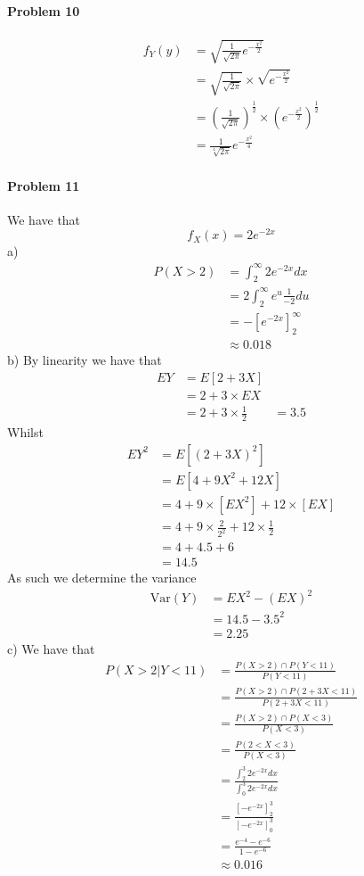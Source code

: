 \paragraph{Problem 10}
\begin{align*}
    f_{Y}(y)&=\sqrt{\frac{1}{\sqrt{2\pi}}e^{-\frac{x^{2}}{2}}} \\
            &=\sqrt{\frac{1}{\sqrt{2\pi}}}\times\sqrt{e^{-\frac{x^{2}}{2}}} \\
            &=\left(\frac{1}{\sqrt{2\pi}}\right)^{\frac{1}{2}}\times\left(e^{-\frac{x^{2}}{2}}\right)^{\frac{1}{2}} \\
            &=\frac{1}{\sqrt[4]{2\pi}}e^{-\frac{x^{2}}{4}}
\end{align*}
\paragraph{Problem 11}
We have that
\[
    f_{X}(x)= 2e^{-2x}
\]
a)
\begin{align*}
    P(X>2)&=\int_{2}^{\infty}2e^{-2x}dx \\
          &=2\int_{2}^{\infty}e^{u}\frac{1}{-2}du \\
          &=-\left[e^{-2x}\right]_{2}^{\infty} \\
          &\approx 0.018
\end{align*}
b)
By linearity we have that
\begin{align*}
    EY&=E[2+3X] \\
      &=2+3\times EX \\
      &=2+3\times\frac{1}{2}
      &=3.5
\end{align*}
Whilst
\begin{align*}
    EY^{2}&=E[(2+3X)^{2}] \\
       &=E[4+9X^{2}+12X] \\
       &=4+9\times[EX^{2}]+12\times[EX] \\ 
       &=4+9\times\frac{2}{2^{2}}+12\times\frac{1}{2} \\
       &=4+4.5+6 \\
       &=14.5
\end{align*}
As such we determine the variance
\begin{align*}
    \text{Var}(Y)&=EX^{2}-(EX)^{2} \\
             &=14.5-3.5^{2} \\
             &=2.25
\end{align*}
c)
We have that
\begin{align*}
    P(X>2|Y<11)&=\frac{P(X>2)\cap P(Y<11)}{P(Y<11)} \\
               &=\frac{P(X>2)\cap P(2+3X<11)}{P(2+3X<11)} \\
               &=\frac{P(X>2)\cap P(X<3)}{P(X<3)} \\
               &=\frac{P(2<X<3)}{P(X<3)} \\
               &=\frac{\int_{2}^{3}2e^{-2x}dx}{\int_{0}^{3}2e^{-2x}dx} \\
               &=\frac{\left[-e^{-2x}\right]_{2}^{3}}{\left[-e^{-2x}\right]_{0}^{3}} \\
               &=\frac{e^{-4}-e^{-6}}{1-e^{-6}} \\
               &\approx 0.016
\end{align*}
